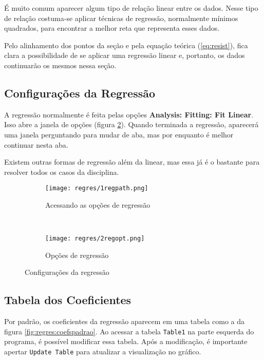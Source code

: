 É muito comum aparecer algum tipo de relação linear entre os dados. Nesse tipo de relação costuma-se aplicar técnicas de regressão, normalmente mínimos quadrados, para encontrar a melhor reta que representa esses dados.

Pelo alinhamento dos pontos da seção  e pela equação teórica (\ref{eq:resist}), fica clara a possibilidade de se aplicar uma regressão linear e, portanto, os dados continuarão os mesmos nessa seção.


\subsection{Configurações da Regressão}

    A regressão normalmente é feita pelas opções \textbf{Analysis: Fitting: Fit Linear}. Isso abre a janela de opções (figura \ref{fig:regres:opt}). Quando terminada a regressão, aparecerá uma janela perguntando para mudar de aba, mas por enquanto é melhor continuar nesta aba.

    Existem outras formas de regressão além da linear, mas essa já é o bastante para resolver todos os casos da disciplina.

    \begin{figure}[htbp]
        \centering
        \begin{subfigure}{0.60\textwidth}
            \centering
            \texttt{[image: regres/1regpath.png]}

            \caption{Acessando as opções de regressão}
            \label{fig:regres:path}
        \end{subfigure}
        ~
        \begin{subfigure}{0.35\textwidth}
            \centering
            \texttt{[image: regres/2regopt.png]}

            \caption{Opções de regressão}
            \label{fig:regres:opt}
        \end{subfigure}
        \caption{Configurações da regressão}
        \label{fig:regres:config}
    \end{figure}


\subsection{Tabela dos Coeficientes}

    Por padrão, os coeficientes da regressão aparecem em uma tabela como a da figura \ref{fig:regres:coefspadrao}. Ao acessar a tabela \texttt{Table1} na parte esquerda do programa, é possível modificar essa tabela. Após a modificação, é importante apertar \texttt{Update Table} para atualizar a visualização no gráfico.

